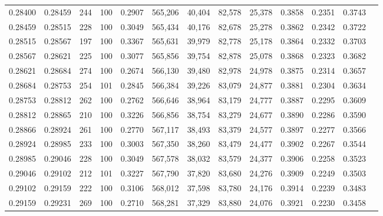 \begin{tabular}{rrrrrrrrrrrrr}
0.28400 & 0.28459 &   244 & 100 &                                     0.2907 & 565,206 &  40,404 &  82,578 &  25,378 & 0.3858 & 0.2351 & 0.3743 \\
0.28459 & 0.28515 &   228 & 100 &                                     0.3049 & 565,434 &  40,176 &  82,678 &  25,278 & 0.3862 & 0.2342 & 0.3722 \\
0.28515 & 0.28567 &   197 & 100 &                                     0.3367 & 565,631 &  39,979 &  82,778 &  25,178 & 0.3864 & 0.2332 & 0.3703 \\
0.28567 & 0.28621 &   225 & 100 &                                     0.3077 & 565,856 &  39,754 &  82,878 &  25,078 & 0.3868 & 0.2323 & 0.3682 \\
0.28621 & 0.28684 &   274 & 100 &                                     0.2674 & 566,130 &  39,480 &  82,978 &  24,978 & 0.3875 & 0.2314 & 0.3657 \\
0.28684 & 0.28753 &   254 & 101 &                                     0.2845 & 566,384 &  39,226 &  83,079 &  24,877 & 0.3881 & 0.2304 & 0.3634 \\
0.28753 & 0.28812 &   262 & 100 &                                     0.2762 & 566,646 &  38,964 &  83,179 &  24,777 & 0.3887 & 0.2295 & 0.3609 \\
0.28812 & 0.28865 &   210 & 100 &                                     0.3226 & 566,856 &  38,754 &  83,279 &  24,677 & 0.3890 & 0.2286 & 0.3590 \\
0.28866 & 0.28924 &   261 & 100 &                                     0.2770 & 567,117 &  38,493 &  83,379 &  24,577 & 0.3897 & 0.2277 & 0.3566 \\
0.28924 & 0.28985 &   233 & 100 &                                     0.3003 & 567,350 &  38,260 &  83,479 &  24,477 & 0.3902 & 0.2267 & 0.3544 \\
0.28985 & 0.29046 &   228 & 100 &                                     0.3049 & 567,578 &  38,032 &  83,579 &  24,377 & 0.3906 & 0.2258 & 0.3523 \\
0.29046 & 0.29102 &   212 & 101 &                                     0.3227 & 567,790 &  37,820 &  83,680 &  24,276 & 0.3909 & 0.2249 & 0.3503 \\
0.29102 & 0.29159 &   222 & 100 &                                     0.3106 & 568,012 &  37,598 &  83,780 &  24,176 & 0.3914 & 0.2239 & 0.3483 \\
0.29159 & 0.29231 &   269 & 100 &                                     0.2710 & 568,281 &  37,329 &  83,880 &  24,076 & 0.3921 & 0.2230 & 0.3458 \\

\end{tabular}
